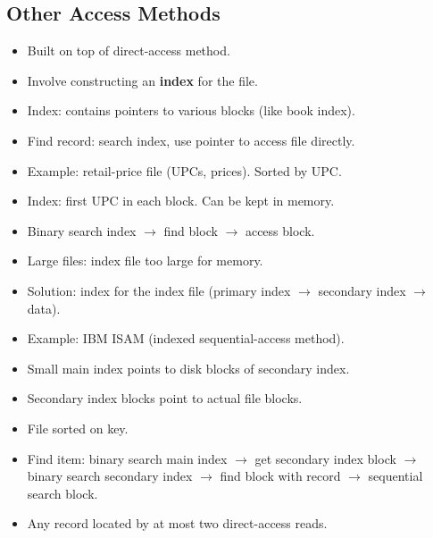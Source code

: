 \subsection*{Other Access Methods}
\begin{itemize}
    \item Built on top of direct-access method.
    \item Involve constructing an \textbf{index} for the file.
    \item Index: contains pointers to various blocks (like book index).
    \item Find record: search index, use pointer to access file directly.
    \item Example: retail-price file (UPCs, prices). Sorted by UPC.
    \item Index: first UPC in each block. Can be kept in memory.
    \item Binary search index $\rightarrow$ find block $\rightarrow$ access block.
    \item Large files: index file too large for memory.
    \item Solution: index for the index file (primary index $\rightarrow$ secondary index $\rightarrow$ data).
    \item Example: IBM ISAM (indexed sequential-access method).
    \item Small main index points to disk blocks of secondary index.
    \item Secondary index blocks point to actual file blocks.
    \item File sorted on key.
    \item Find item: binary search main index $\rightarrow$ get secondary index block $\rightarrow$ binary search secondary index $\rightarrow$ find block with record $\rightarrow$ sequential search block.
    \item Any record located by at most two direct-access reads.
\end{itemize}

